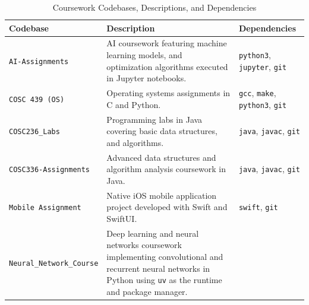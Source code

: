 \begin{table}[htbp]
	\centering
	\small
	\caption{Coursework Codebases, Descriptions, and Dependencies}
	\label{tab:coursework-codebases}
	\begin{tabularx}
		{\textwidth}{@{}l >{\RaggedRight\arraybackslash}X >{\RaggedRight\arraybackslash}p{3.4cm}@{}}
		\toprule \textbf{Codebase}                                               & \textbf{Description}                                         & \textbf{Dependencies}
		\\ \midrule \texttt{AI-Assignments} & AI coursework featuring machine
		learning models, and optimization algorithms executed in Jupyter notebooks.
		                                                                         & \texttt{python3}, \texttt{jupyter}, \texttt{git}                                     \\ \addlinespace \texttt{COSC
		439 (OS)}                                                                & Operating systems assignments in C and Python.               & \texttt{gcc},
		\texttt{make}, \texttt{python3}, \texttt{git}                                                                                                                   \\ \addlinespace \texttt{COSC236\_Labs}
		                                                                         & Programming labs in Java covering basic data structures, and
		algorithms.                                                              & \texttt{java}, \texttt{javac}, \texttt{git}                                          \\
		\addlinespace \texttt{COSC336-Assignments}                               & Advanced data structures and
		algorithm analysis coursework in Java.                                   & \texttt{java}, \texttt{javac},
		\texttt{git}                                                                                                                                                    \\ \addlinespace \texttt{Mobile Assignment} & Native iOS
		mobile application project developed with Swift and SwiftUI.             & \texttt{swift},
		\texttt{git}                                                                                                                                                    \\ \addlinespace \texttt{Neural\_Network\_Course} & Deep learning
		and neural networks coursework implementing convolutional and recurrent neural
		networks in Python using \texttt{uv} as the runtime and package manager. &

\end{tabularx}
\end{table}
